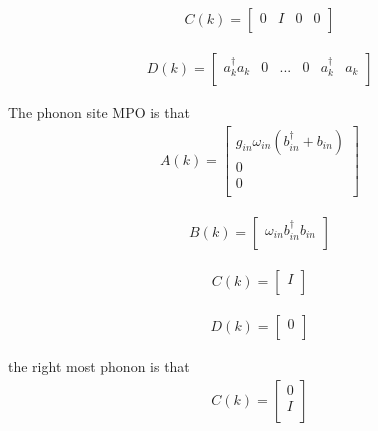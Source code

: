 \documentclass[a4paper,11pt]{ctexart}
\begin{document}
\begin{gather}
C(k) = 
\begin{bmatrix}
    0 & I & 0 & 0 \\ 
\end{bmatrix}
\end{gather}

\begin{gather}
D(k) = 
\begin{bmatrix}
    a^\dagger_k a_k & 0 & ... & 0 & a^\dagger_k & a_k  \\ 
\end{bmatrix}
\end{gather}

The phonon site MPO is that
\begin{gather}
A(k) = 
\begin{bmatrix}
    g_{in} \omega_{in}(b^\dagger_{in}+b_{in})  \\
    0 \\
    0 \\
\end{bmatrix}
\end{gather}

\begin{gather}
B(k) = 
\begin{bmatrix}
    \omega_{in} b^\dagger_{in}b_{in}   \\
\end{bmatrix}
\end{gather}

\begin{gather}
C(k) = 
\begin{bmatrix}
    I \\ 
\end{bmatrix}
\end{gather}

\begin{gather}
D(k) = 
\begin{bmatrix}
     0 \\ 
\end{bmatrix}
\end{gather}

the right most phonon is that
\begin{gather}
C(k) = 
\begin{bmatrix}
    0 \\
    I \\ 
\end{bmatrix}
\end{gather}
\end{document}
